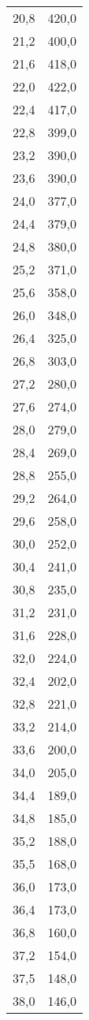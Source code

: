 \begin{longtable}{ S S }
    20,8 & 420,0 \\
    21,2 & 400,0 \\
    21,6 & 418,0 \\
    22,0 & 422,0 \\
    22,4 & 417,0 \\
    22,8 & 399,0 \\
    23,2 & 390,0 \\
    23,6 & 390,0 \\
    24,0 & 377,0 \\
    24,4 & 379,0 \\
    24,8 & 380,0 \\
    25,2 & 371,0 \\
    25,6 & 358,0 \\
    26,0 & 348,0 \\
    26,4 & 325,0 \\
    26,8 & 303,0 \\
    27,2 & 280,0 \\
    27,6 & 274,0 \\
    28,0 & 279,0 \\
    28,4 & 269,0 \\
    28,8 & 255,0 \\
    29,2 & 264,0 \\
    29,6 & 258,0 \\
    30,0 & 252,0 \\
    30,4 & 241,0 \\
    30,8 & 235,0 \\
    31,2 & 231,0 \\
    31,6 & 228,0 \\
    32,0 & 224,0 \\
    32,4 & 202,0 \\
    32,8 & 221,0 \\
    33,2 & 214,0 \\
    33,6 & 200,0 \\
    34,0 & 205,0 \\
    34,4 & 189,0 \\
    34,8 & 185,0 \\
    35,2 & 188,0 \\
    35,5 & 168,0 \\
    36,0 & 173,0 \\
    36,4 & 173,0 \\
    36,8 & 160,0 \\
    37,2 & 154,0 \\
    37,5 & 148,0 \\
    38,0 & 146,0 \\

\end{longtable}
